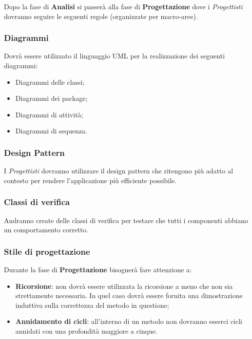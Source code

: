Dopo la fase di \textbf{Analisi} si passerà alla fase di \textbf{Progettazione} dove i \textit{Progettisti} dovranno seguire le seguenti regole (organizzate per macro-aree).\\

\subsubsection{Diagrammi}

Dovrà essere utilizzato il linguaggio UML per la realizzazione dei seguenti diagrammi:

\begin{itemize}
	\item Diagrammi delle classi;
	\item Diagrammi dei package;
	\item Diagrammi di attività;
	\item Diagrammi di sequenza.
\end{itemize}

\subsubsection{Design Pattern}

I \textit{Progettisti} dovranno utilizzare il design pattern che ritengono più adatto al contesto per rendere l'applicazione più efficiente possibile.

\subsubsection{Classi di verifica}

Andranno create delle classi di verifica per testare che tutti i componenti abbiano un comportamento corretto.

\subsubsection{Stile di progettazione}

Durante la fase di \textbf{Progettazione} bisognerà fare attenzione a:

\begin{itemize}
\item \textbf{Ricorsione}: non dovrà essere utilizzata la ricorsione a meno che non sia strettamente necessaria. In quel caso dovrà essere fornita una dimostrazione induttiva sulla correttezza del metodo in questione;
\item \textbf{Annidamento di cicli}: all'interno di un metodo non dovranno esserci cicli annidati con una profondità maggiore a cinque.
\end{itemize}